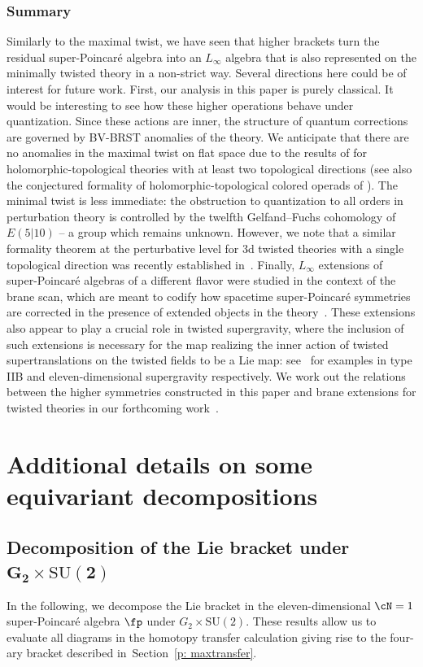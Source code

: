 \documentclass[pdftex]{sigma}
\numberwithin{equation}{section}
\theoremstyle{definition}
\def\SU{\ensuremath{\mathrm{SU}}}
\begin{document}
\subsubsection{Summary}
Similarly to the maximal twist, we have seen that higher brackets turn the residual super-Poincar\'e algebra into an $L_\infty$ algebra that is also represented on the minimally twisted theory in a non-strict way. Several directions here could be of interest for future work. First, our analysis in this paper is purely classical. It would be interesting to see how these higher operations behave under quantization. Since these actions are inner, the structure of quantum corrections are governed by BV-BRST anomalies of the theory. We anticipate that there are no anomalies in the maximal twist on flat space due to the results of \cite{williamswang} for holomorphic-topological theories with at least two topological directions (see also the conjectured formality of holomorphic-topological colored operads of \cite{Gaiotto:2024gii}). The minimal twist is less immediate: the obstruction to quantization to all orders in perturbation theory is controlled by the twelfth Gelfand--Fuchs cohomology of~$E(5|10)$ -- a group which remains unknown. However, we note that a similar formality theorem at the perturbative level for 3d twisted theories with a single topological direction was recently established in~\cite{Dimofte:2025oqf}. Finally, $L_\infty$ extensions of super-Poincar\'e algebras of a different flavor were studied in the context of the brane scan, which are meant to codify how spacetime super-Poincar\'e symmetries are corrected in the presence of extended objects in the theory~\cite{FSS}. These extensions also appear to play a crucial role in twisted supergravity, where the inclusion of such extensions is necessary for the map realizing the inner action of twisted supertranslations on the twisted fields to be a Lie map: see~\cite{CostelloLi, RSW} for examples in type IIB and eleven-dimensional supergravity respectively. We work out the relations between the higher symmetries constructed in this paper and brane extensions for twisted theories in our forthcoming work~\cite{twistedBranes}.

\appendix

\section{Additional details on some equivariant decompositions} \label{ap: details}

\subsection[Decomposition of the Lie bracket under G\_2 times SU(2)]{Decomposition of the Lie bracket under $\boldsymbol{ G_2 \times \SU(2)}$}
In the following, we decompose the Lie bracket in the eleven-dimensional $\cN=1$ super-Poincar\'e algebra $\fp$ under $G_2 \times \SU(2)$. These results allow us to evaluate all diagrams in the homotopy transfer calculation giving rise to the four-ary bracket described in~Section~\ref{p: maxtransfer}.
\end{document}
